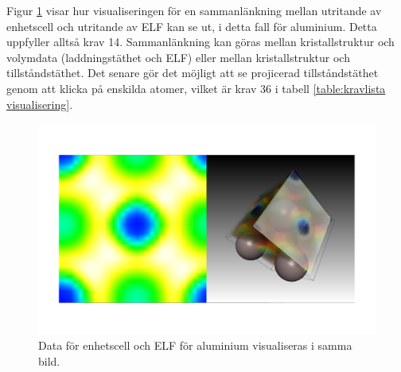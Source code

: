 \documentclass[a4paper,12pt,twoside,openright]{report}
\begin{document}
Figur \ref{fig:visualisering_sammanlankning} visar hur visualiseringen för en sammanlänkning mellan utritande av enhetscell och utritande av ELF kan se ut, i detta fall för aluminium. Detta uppfyller alltså krav 14. Sammanlänkning kan göras mellan kristallstruktur och volymdata (laddningstäthet och ELF) eller mellan kristallstruktur och tillståndstäthet. Det senare gör det möjligt att se projicerad tillståndstäthet genom att klicka på enskilda atomer, vilket är krav 36 i tabell \ref{table:kravlista visualisering}.
\begin{figure}[H]
	\centering
	\includegraphics[scale=0.2]{sammanlankning_visualisering_Al.png}
	\caption{Data för enhetscell och ELF för aluminium visualiseras i samma bild.}
	\label{fig:visualisering_sammanlankning}
\end{figure}
\end{document}
